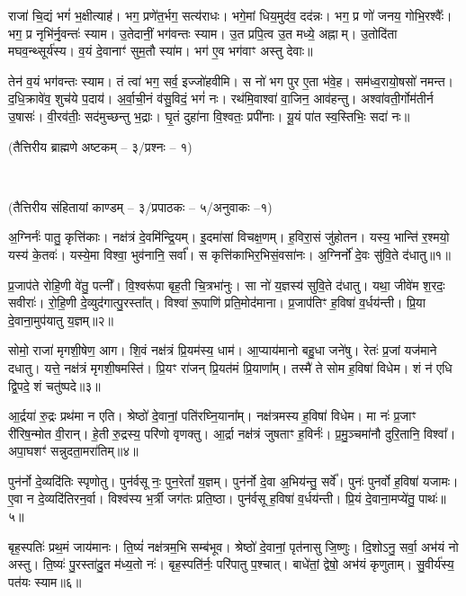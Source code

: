राजा॑ चि॒द्यं भगं॑ भ॒क्षीत्याह॑।
भग॒ प्रणे॑त॒र्भग॒ सत्य॑राधः।
भगे॒मां धिय॒मुद॑व॒ दद॑न्नः।
भग॒ प्र णो॑ जनय॒ गोभि॒रश्वैः᳚।
भग॒ प्र नृभि॑र्नृ॒वन्तः॑ स्याम।
उ॒तेदानीं॒ भग॑वन्तः स्याम।
उ॒त प्रपि॒त्व उ॒त मध्ये॒ अह्नाम्।
उ॒तोदि॑ता मघव॒न्थ्सूर्य॑स्य।
व॒यं दे॒वानाꣳ॑ सुम॒तौ स्या॑म।
भग॑ ए॒व भग॑वाꣳ अस्तु देवाः॥

तेन॑ व॒यं भग॑वन्तः स्याम।
तं त्वा॑ भग॒ सर्व॒ इज्जो॑हवीमि।
स नो॑ भग पुर ए॒ता भ॑वे॒ह।
सम॑ध्व॒रायो॒षसो॑ नमन्त।
द॒धि॒क्रावे॑व॒ शुच॑ये प॒दाय॑।
अ॒र्वा॒ची॒नं व॑सु॒विदं॒ भगं॑ नः।
रथ॑मि॒वाश्वा॑ वा॒जिन॒ आव॑हन्तु।
अश्वा॑वती॒र्गोम॑तीर्न उ॒षासः॑।
वी॒रव॑तीः॒ सद॑मुच्छन्तु भ॒द्राः।
घृ॒तं दुहा॑ना वि॒श्वतः॒ प्रपी॑नाः।
यू॒यं पा॑त स्व॒स्तिभिः॒ सदा॑ नः॥

\centerline{\normalsize(तैत्तिरीय ब्राह्मणे अष्टकम् -- ३/प्रश्नः -- १)}\mbox{}\\[-2em]
\centerline{\normalsize(तैत्तिरीय संहितायां काण्डम् -- ३/प्रपाठकः -- ५/अनुवाकः --१)}

अ॒ग्निर्नः॑ पातु॒ कृत्ति॑काः। 
नक्ष॑त्रं दे॒वमि॑न्द्रि॒यम्। 
इ॒दमा॑सां विचक्ष॒णम्। 
ह॒विरा॒सं जु॑होतन। 
यस्य॒ भान्ति॑ र॒श्मयो॒ यस्य॑ के॒तवः॑। 
यस्ये॒मा विश्वा॒ भुव॑नानि॒ सर्वा᳚। 
स कृत्ति॑काभि\-र॒भिसं॒वसा॑नः। 
अ॒ग्निर्नो॑ दे॒वः सु॑वि॒ते द॑धातु॥१॥ 

प्र॒जाप॑ते रोहि॒णी वे॑तु॒ पत्नी᳚। 
वि॒श्वरू॑पा बृह॒ती चि॒त्रभा॑नुः। 
सा नो॑ य॒ज्ञस्य॑ सुवि॒ते द॑धातु। 
यथा॒ जीवे॑म श॒रदः॒ सवीराः॑। 
रो॒हि॒णी दे॒व्युद॑गात्पु॒रस्ता᳚त्। 
विश्वा॑ रू॒पाणि॑ प्रति॒मोद॑माना। 
प्र॒जाप॑तिꣳ ह॒विषा॑ व॒र्धय॑न्ती। 
प्रि॒या दे॒वाना॒मुप॑यातु य॒ज्ञम्॥२॥ 

सोमो॒ राजा॑ मृगशी॒\ar{}षेण॒ आग\snn{}। 
शि॒वं नक्ष॑त्रं प्रि॒यम॑स्य॒ धाम॑। 
आ॒प्याय॑मानो बहु॒धा जने॑षु। 
रेतः॑ प्र॒जां यज॑माने दधातु। 
यत्ते॒ नक्ष॑त्रं मृगशी॒\ar{}षमस्ति॑। 
प्रि॒यꣳ रा॑जन् प्रि॒यत॑मं प्रि॒याणा᳚म्। 
तस्मै॑ ते सोम ह॒विषा॑ विधेम। 
शं न॑ एधि द्वि॒पदे॒ शं चतु॑ष्पदे॥३॥ 

आ॒र्द्रया॑ रु॒द्रः प्रथ॑मा न एति। 
श्रेष्ठो॑ दे॒वानां॒ पति॑रघ्नि॒याना᳚म्। 
नक्ष॑त्रमस्य ह॒विषा॑ विधेम। 
मा नः॑ प्र॒जाꣳ री॑रिष॒न्मोत वी॒रान्। 
हे॒ती रु॒द्रस्य॒ परि॑णो वृणक्तु। 
आ॒र्द्रा नक्ष॑त्रं जुषताꣳ ह॒विर्नः॑। 
प्र॒मु॒ञ्चमा॑नौ दुरि॒तानि॒ विश्वा᳚। 
अपा॒घशꣳ॑ सन्नुदता॒मरा॑तिम्॥४॥ 

पुन॑र्नो दे॒व्यदि॑तिः स्पृणोतु। 
पुन॑र्वसू नः॒ पुन॒रेतां᳚ य॒ज्ञम्। 
पुन॑र्नो दे॒वा अ॒भिय॑न्तु॒ सर्वे᳚। 
पुनः॑ पुनर्वो ह॒विषा॑ यजामः। 
ए॒वा न दे॒व्यदि॑तिरन॒र्वा। 
विश्व॑स्य भ॒र्त्री जग॑तः प्रति॒ष्ठा। 
पुन॑र्वसू ह॒विषा॑ व॒र्धय॑न्ती। 
प्रि॒यं दे॒वाना॒मप्ये॑तु॒ पाथः॑॥५॥ 

बृह॒स्पतिः॑ प्रथ॒मं जाय॑मानः। 
ति॒ष्यं॑ नक्ष॑त्रम॒भि सम्ब॑भूव। 
श्रेष्ठो॑ दे॒वानां॒ पृत॑नासु  जि॒ष्णुः। 
दि॒शोऽनु॒ सर्वा॒ अभ॑यं नो अस्तु। 
ति॒ष्यः॑ पु॒रस्ता॑दु॒त म॑ध्य॒तो नः॑। 
बृह॒स्पति॑र्नः॒ परि॑पातु प॒श्चात्। 
बाधे॑तां॒ द्वेषो॒ अभ॑यं कृणुताम्। 
सु॒वीर्य॑स्य॒ पत॑यः स्याम॥६॥ 

